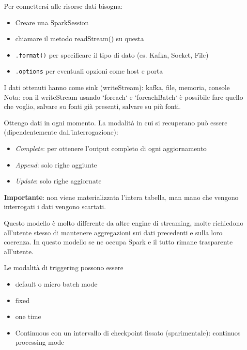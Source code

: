 \documentclass[12pt,italian]{article}
\begin{document}
Per connettersi alle risorse dati bisogna:
\begin{itemize}
	\item Creare una SparkSession
	\item chiamare il metodo readStream() su questa
	\item \texttt{.format()} per specificare il tipo di dato (es. Kafka, Socket, File)
	\item \texttt{.options} per eventuali opzioni come host e porta
\end{itemize}

I dati ottenuti hanno come sink (writeStream): kafka, file, memoria, console
Nota: con il writeStream usando `foreach` e `foreachBatch` è possibile fare quello che voglio, salvare su fonti già presenti, salvare su più fonti.

Ottengo dati in ogni momento.
La modalità in cui si recuperano può essere (dipendentemente dall'interrogazione): 
\begin{itemize}
	\item \textit{Complete}: per ottenere l'output completo di ogni aggiornamento
	\item \textit{Append}: solo righe aggiunte
	\item \textit{Update}: solo righe aggiornate
\end{itemize}

\textbf{Importante}: non viene materializzata l'intera tabella, man mano che vengono interrogati i dati vengono scartati. 

Questo modello è molto differente da altre engine di streaming, molte richiedono all'utente stesso di mantenere aggregazioni sui dati precedenti e sulla loro coerenza.
In questo modello se ne occupa Spark e il tutto rimane trasparente all'utente.

Le modalità di triggering possono essere
\begin{itemize}
	\item default o micro batch mode
	\item fixed
	\item one time
	\item Continuous con un intervallo di checkpoint fissato (sparimentale): continuos processing mode
\end{itemize}
\end{document}
